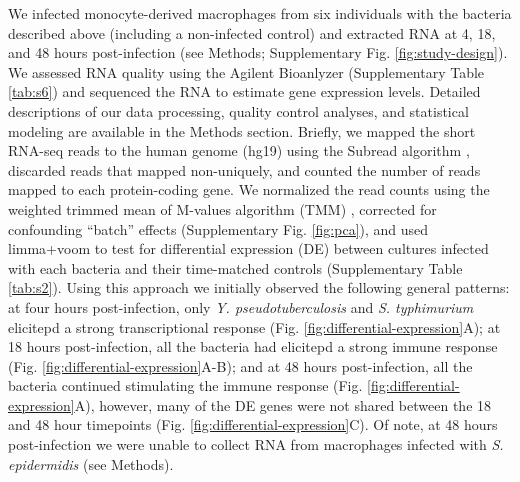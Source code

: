 We infected monocyte-derived macrophages from six individuals with the
bacteria described above (including a non-infected control) and
extracted RNA at 4, 18, and 48 hours post-infection (see Methods;
Supplementary Fig. \ref{fig:study-design}). We assessed RNA quality using the Agilent
Bioanlyzer (Supplementary Table \ref{tab:s6}) and sequenced the RNA to estimate
gene expression levels. Detailed descriptions of our data processing,
quality control analyses, and statistical modeling are available in
the Methods section. Briefly, we mapped the short RNA-seq reads to the
human genome (hg19) using the Subread algorithm \citep{Liao2013},
discarded reads that mapped non-uniquely, and counted the number of
reads mapped to each protein-coding gene. We normalized the read
counts using the weighted trimmed mean of M-values algorithm (TMM)
\citep{Robinson2010}, corrected for confounding ``batch'' effects
(Supplementary Fig. \ref{fig:pca}), and used limma+voom \citep{Smyth2004,
  Smyth2005, Law2014} to test for differential expression (DE) between
cultures infected with each bacteria and their time-matched controls
(Supplementary Table \ref{tab:s2}). Using this approach we initially observed
the following general patterns: at four hours post-infection, only
\emph{Y. pseudotuberculosis} and \emph{S. typhimurium} elicitepd a
strong transcriptional response (Fig.
\ref{fig:differential-expression}A); at 18 hours post-infection, all
the bacteria had elicitepd a strong immune response
(Fig. \ref{fig:differential-expression}A-B); and at 48 hours
post-infection, all the bacteria continued stimulating the immune
response (Fig. \ref{fig:differential-expression}A), however, many of
the DE genes were not shared between the 18 and 48 hour timepoints
(Fig. \ref{fig:differential-expression}C). Of note, at 48 hours
post-infection we were unable to collect RNA from macrophages infected
with \emph{S.  epidermidis} (see Methods).

